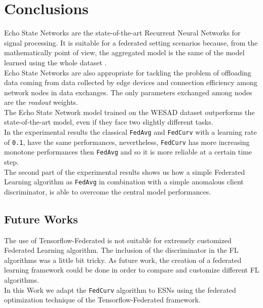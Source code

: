 \chapter{Conclusions}\label{chapter:conclusions}

Echo State Networks are the state-of-the-art Recurrent Neural Networks for signal processing. It is suitable for a federated setting scenarios because, from the mathematically point of view, the aggregated model is the same of the model learned using the whole dataset \cite{bacciu2021federated}. \\

Echo State Networks are also appropriate for tackling the problem of offloading data coming from data collected by edge devices and connection efficiency among network nodes in data exchanges. The only parameters exchanged among nodes are the \textit{readout} weights. \\

The Echo State Network model trained on the WESAD dataset outperforms the state-of-the-art model, even if they face two slightly different tasks. \\

In the experimental results the classical \texttt{FedAvg} and \texttt{FedCurv} with a learning rate of \texttt{0.1}, have the same performances, nevertheless, \texttt{FedCurv} has more increasing monotone performances then \texttt{FedAvg} and so it is more reliable at a certain time step. \\

The second part of the experimental results shows us how a simple Federated Learning algorithm as \texttt{FedAvg} in combination with a simple anomalous client discriminator, is able to overcome the central model performances.


\section{Future Works}

The use of Tensorflow-Federated is not suitable for extremely customized Federated Learning algorithm. The inclusion of the discriminator in the FL algorithms was a little bit tricky. As future work, the creation of a federated learning framework could be done in order to compare and customize different FL algorithms. \\

In this Work we adapt the \texttt{FedCurv} algorithm to ESNs using the federated optimization technique of the  Tensorflow-Federated framework.\\

